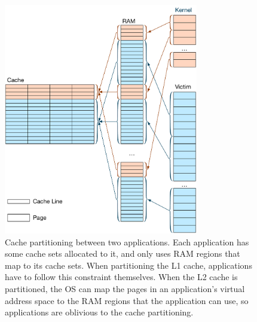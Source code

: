 \begin{figure}[hbt]
  \centering
  \includegraphics[width=85mm]{figures/cache_partitions.pdf}
  \caption{
    Cache partitioning between two applications. Each application has some
    cache sets allocated to it, and only uses RAM regions that map to its cache
    sets. When partitioning the L1 cache, applications have to follow this
    constraint themselves. When the L2 cache is partitioned, the OS can map the
    pages in an application's virtual address space to the RAM regions that the
    application can use, so applications are oblivious to the cache
    partitioning.
  }
  \label{fig:cache_partitions}
\end{figure}
